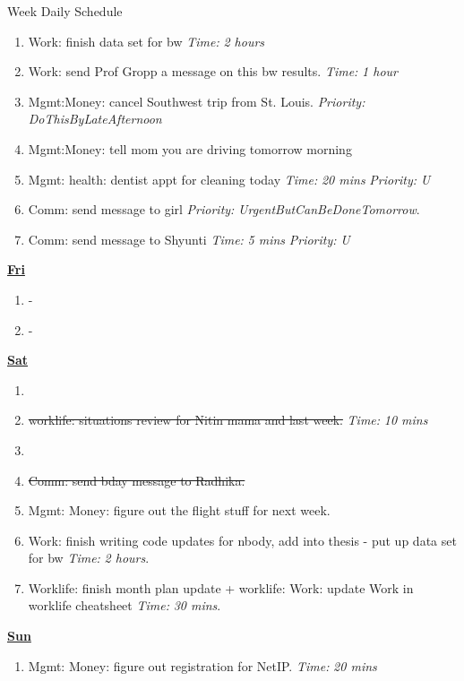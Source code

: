 \documentclass[serif, mathserif, final]{beamer}
\newcommand{\doneTask}[1]{\item \sout{#1}}
\newcommand{\timeEst}[1]{\textit{Time:} \textit{#1}}
\newcommand{\priority}[1]{\textit{Priority:} \textit{#1}}
\begin{document}
\begin{frame}{}
\begin{columns}
\begin{column}{0.50\linewidth}
\begin{block}{Week Daily Schedule}
\begin{enumerate}
\tiny \item \tiny Work: finish data set for bw \timeEst{2 hours}

\item \tiny Work:  send Prof Gropp a message on this bw results. \timeEst{1 hour} 

\item \tiny Mgmt:Money: cancel Southwest trip from St. Louis. \priority{DoThisByLateAfternoon}
\item \tiny Mgmt:Money: tell mom you are driving tomorrow morning

\item \tiny Mgmt: health: dentist appt for cleaning today \timeEst{20 mins} \priority{U} 

\item \tiny Comm: send message to girl \priority{UrgentButCanBeDoneTomorrow}. 
\item \tiny Comm: send message to Shyunti \timeEst{5 mins} \priority{U} 

\end{enumerate}


\textbf{\small {\underline{Fri}}} 
\begin{enumerate} 
\tiny \item \tiny - 
\item \tiny - 
\end{enumerate}

\textbf{\small \underline{Sat}} 
\begin{enumerate} 
\item \tiny \doneTask{worklife: situations review for Nitin mama and last week.} \timeEst{10 mins} 
\item \tiny \doneTask{Comm: send bday message to Radhika.}
\item \tiny Mgmt: Money: figure out the flight stuff for next week. 

\item \tiny Work: finish writing code updates for nbody, add into thesis - put up data set for bw \timeEst{2 hours}. 

\item \tiny Worklife: finish month plan update +  worklife: Work: update Work in worklife cheatsheet \timeEst{30 mins}. 

\end{enumerate} 

\textbf{\small \underline{Sun}}
\begin{enumerate} 
\item \tiny Mgmt: Money: figure out registration for NetIP. \timeEst{20 mins} 


\end{enumerate}
\end{block}
\end{column}
\end{columns}
\end{frame}
\end{document}
